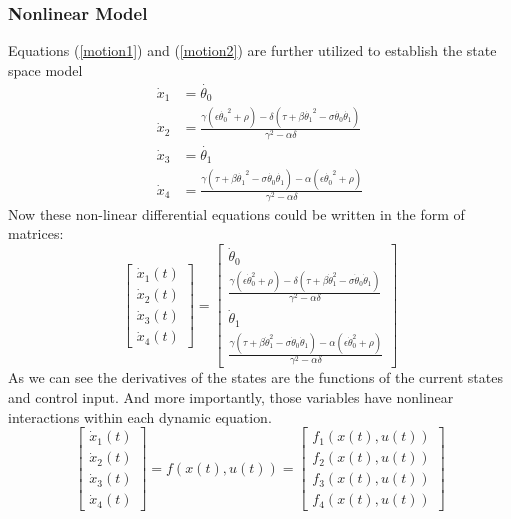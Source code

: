 \subsubsection{Nonlinear Model}
Equations (\ref{motion1}) and (\ref{motion2}) are further utilized to establish the state
space model
\begin{subequations}
	\begin{align}
	\dot{x}_1 &= \dot{\theta_0} \\
	\dot{x}_2 &= \frac{\gamma(\epsilon\dot{\theta_0}^2+\rho)-\delta(\tau+\beta\dot{\theta_1}^2-\sigma\dot{\theta_0}\dot{\theta_1})}{\gamma^2-\alpha\delta}\\
	\dot{x}_3 &= \dot{\theta_1}\\
	\dot{x}_4 &= \frac{\gamma(\tau+\beta\dot{\theta_1}^2-\sigma\dot{\theta_0}\dot{\theta_1})-\alpha(\epsilon\dot{\theta_0}^2+\rho)}{\gamma^2-\alpha\delta}
	\end{align}
\end{subequations}
Now these non-linear differential equations could be written in the form of matrices:
\begin{equation}\label{nonlinmodel}
\begin{bmatrix}
\dot{x}_1(t) \\ \dot{x}_2(t) \\ \dot{x}_3(t) \\ \dot{x}_4(t)
\end{bmatrix} = \begin{bmatrix}
\dot{\theta}_0\\
\frac{\gamma(\epsilon\dot{\theta}_0^2+\rho)-\delta(\tau+\beta\dot{\theta}_1^2-\sigma\dot{\theta}_0\dot{\theta}_1)}{\gamma^2-\alpha\delta}\\
\dot{\theta}_1\\
\frac{\gamma(\tau+\beta\dot{\theta}_1^2-\sigma\dot{\theta}_0\dot{\theta}_1)-\alpha(\epsilon\dot{\theta}_0^2+\rho)}{\gamma^2-\alpha\delta}
\end{bmatrix}
\end{equation}
As we can see the derivatives of the states are the functions of the current states and control input. And more importantly, those variables have nonlinear interactions within each dynamic equation. 
\begin{equation}\begin{bmatrix}
\dot{x}_1(t) \\ \dot{x}_2(t) \\ \dot{x}_3(t) \\ \dot{x}_4(t)
\end{bmatrix} = f(x(t),u(t)) =\begin{bmatrix}f_1(x(t),u(t))\\f_2(x(t),u(t))\\f_3(x(t),u(t))\\f_4(x(t),u(t))\end{bmatrix} \end{equation}
